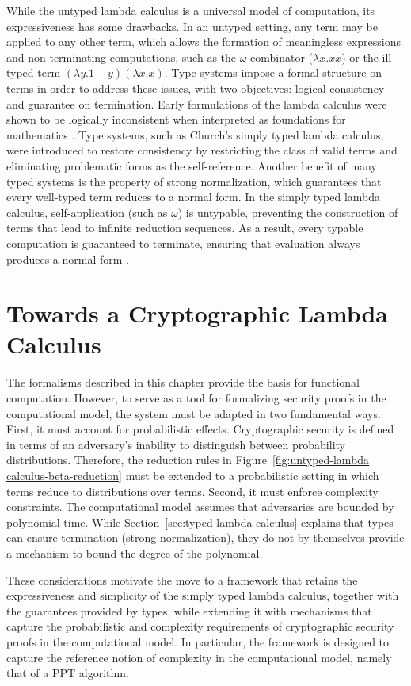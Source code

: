 While the untyped lambda calculus is a universal model of computation, its expressiveness has some drawbacks. In an untyped setting, any term may be applied to any other term, which allows the formation of meaningless expressions and non-terminating computations, such as the $\omega$ combinator ($\lambda x.xx$) or the ill-typed term $(\lambda y.1+y)(\lambda x.x)$. Type systems impose a formal structure on terms in order to address these issues, with two objectives: logical consistency and guarantee on termination. Early formulations of the lambda calculus were shown to be logically inconsistent when interpreted as foundations for mathematics \cite{The_Inconsistency_of_Certain_Formal_Logics}. Type systems, such as Church’s simply typed lambda calculus, were introduced to restore consistency by restricting the class of valid terms and eliminating problematic forms as the self-reference. Another benefit of many typed systems is the property of strong normalization, which guarantees that every well-typed term reduces to a normal form. In the simply typed lambda calculus, self-application (such as $\omega$) is untypable, preventing the construction of terms that lead to infinite reduction sequences. As a result, every typable computation is guaranteed to terminate, ensuring that evaluation always produces a normal form \cite{Girard1989-GIRPAT}.

\section{Towards a Cryptographic Lambda Calculus}
The formalisms described in this chapter provide the basis for functional computation. However, to serve as a tool for formalizing security proofs in the computational model, the system must be adapted in two fundamental ways. First, it must account for probabilistic effects. Cryptographic security is defined in terms of an adversary's inability to distinguish between probability distributions. Therefore, the reduction rules in Figure~\ref{fig:untyped-lambda calculus-beta-reduction} must be extended to a probabilistic setting in which terms reduce to distributions over terms. Second, it must enforce complexity constraints. The computational model assumes that adversaries are bounded by polynomial time. While Section~\ref{sec:typed-lambda calculus} explains that types can ensure termination (strong normalization), they do not by themselves provide a mechanism to bound the degree of the polynomial.

These considerations motivate the move to a framework that retains the expressiveness and simplicity of the simply typed lambda calculus, together with the guarantees provided by types, while extending it with mechanisms that capture the probabilistic and complexity requirements of cryptographic security proofs in the computational model. In particular, the framework is designed to capture the reference notion of complexity in the computational model, namely that of a PPT algorithm.